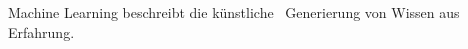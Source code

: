 \documentclass[preview]{standalone}
\begin{document}
\begin{center}
Machine Learning beschreibt die künstliche \ Generierung von Wissen aus Erfahrung.
\end{center}
\end{document}
